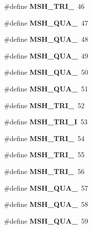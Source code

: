 \begin{DoxyCompactItemize}
\item 
\#define {\bfseries M\-S\-H\-\_\-\-T\-R\-I\-\_}~46\label{GmshDefines_8h_a57f0f046edb143fd0daf97d7b48f1e0a}

\item 
\#define {\bfseries M\-S\-H\-\_\-\-Q\-U\-A\-\_}~47\label{GmshDefines_8h_a72f9f1e691631e81bf69dec942eadcef}

\item 
\#define {\bfseries M\-S\-H\-\_\-\-Q\-U\-A\-\_}~48\label{GmshDefines_8h_a503451125215fadf6e987c3694c8c71e}

\item 
\#define {\bfseries M\-S\-H\-\_\-\-Q\-U\-A\-\_}~49\label{GmshDefines_8h_a03293d6da031f933a8ba8c7bf4e5a0fd}

\item 
\#define {\bfseries M\-S\-H\-\_\-\-Q\-U\-A\-\_}~50\label{GmshDefines_8h_af5e4495aa0564c1d3c4e959c7f8994af}

\item 
\#define {\bfseries M\-S\-H\-\_\-\-Q\-U\-A\-\_}~51\label{GmshDefines_8h_a37b9a30b7b0d451c679529187c91008e}

\item 
\#define {\bfseries M\-S\-H\-\_\-\-T\-R\-I\-\_}~52\label{GmshDefines_8h_a46fe2c1eba39dfcab21544b6cf07bc86}

\item 
\#define {\bfseries M\-S\-H\-\_\-\-T\-R\-I\-\_\-I}~53\label{GmshDefines_8h_a8cb51e0517c40dcd87476d439793060a}

\item 
\#define {\bfseries M\-S\-H\-\_\-\-T\-R\-I\-\_}~54\label{GmshDefines_8h_a39f7a8da80afe80b7f5d76994619478b}

\item 
\#define {\bfseries M\-S\-H\-\_\-\-T\-R\-I\-\_}~55\label{GmshDefines_8h_a87170aaa448eac05723ad08a73c7e883}

\item 
\#define {\bfseries M\-S\-H\-\_\-\-T\-R\-I\-\_}~56\label{GmshDefines_8h_a8587efb13edf137e4be7ff9a827720d2}

\item 
\#define {\bfseries M\-S\-H\-\_\-\-Q\-U\-A\-\_}~57\label{GmshDefines_8h_af4ab811644b42b6842300b5502c597b2}

\item 
\#define {\bfseries M\-S\-H\-\_\-\-Q\-U\-A\-\_}~58\label{GmshDefines_8h_a05f25774a1fdbae8d1d177bfb417904d}

\item 
\#define {\bfseries M\-S\-H\-\_\-\-Q\-U\-A\-\_}~59\label{GmshDefines_8h_a65c5c5dfe47666dec9bbfd2adf09ef93}


\end{DoxyCompactItemize}
